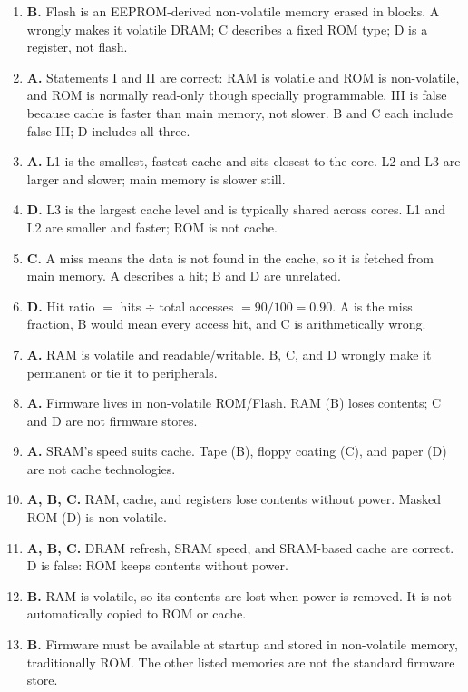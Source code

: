 \begin{enumerate}[label=\textbf{Q\arabic*.}, leftmargin=*]
  PROM cannot be erased, EPROM needs UV light plus removal, and SRAM is
  volatile RAM.
\item \textbf{B.} Flash is an EEPROM-derived non-volatile memory erased in
  blocks. A wrongly makes it volatile DRAM; C describes a fixed ROM type; D
  is a register, not flash.
\item \textbf{A.} Statements I and II are correct: RAM is volatile and ROM
  is non-volatile, and ROM is normally read-only though specially
  programmable. III is false because cache is faster than main memory, not
  slower. B and C each include false III; D includes all three.
\item \textbf{A.} L1 is the smallest, fastest cache and sits closest to the
  core. L2 and L3 are larger and slower; main memory is slower still.
\item \textbf{D.} L3 is the largest cache level and is typically shared
  across cores. L1 and L2 are smaller and faster; ROM is not cache.
\item \textbf{C.} A miss means the data is not found in the cache, so it is
  fetched from main memory. A describes a hit; B and D are unrelated.
\item \textbf{D.} Hit ratio $=$ hits $\div$ total accesses $= 90/100 = 0.90$.
  A is the miss fraction, B would mean every access hit, and C is
  arithmetically wrong.

\item \textbf{A.} RAM is volatile and readable/writable. B, C, and D wrongly make it permanent or tie it to peripherals.
\item \textbf{A.} Firmware lives in non-volatile ROM/Flash. RAM (B) loses contents; C and D are not firmware stores.
\item \textbf{A.} SRAM's speed suits cache. Tape (B), floppy coating (C), and paper (D) are not cache technologies.
\item \textbf{A, B, C.} RAM, cache, and registers lose contents without power. Masked ROM (D) is non-volatile.
\item \textbf{A, B, C.} DRAM refresh, SRAM speed, and SRAM-based cache are correct. D is false: ROM keeps contents without power.
\item \textbf{B.} RAM is volatile, so its contents are lost when power is removed. It is not automatically copied to ROM or cache.

\item \textbf{B.} Firmware must be available at startup and stored in non-volatile memory, traditionally ROM. The other listed memories are not the standard firmware store.


\end{enumerate}

